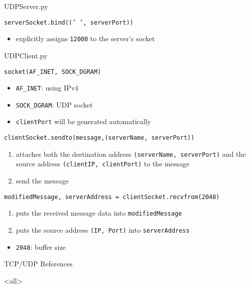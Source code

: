 \begin{frame}{UDPServer.py}
  \begin{center}
  \end{center}
  \begin{iblock}{\texttt{serverSocket.bind(('\,', serverPort))}}
    \begin{itemize}
    \item explicitly assigns \texttt{12000} to the server's socket
    \end{itemize}
  \end{iblock}
\end{frame}

\begin{frame}[t,allowframebreaks]{UDPClient.py}
  \begin{center}
  \end{center}
  \begin{iblock}{\texttt{socket(AF\_INET, SOCK\_DGRAM)}}
    \begin{itemize}
    \item \texttt{AF\_INET}: using IPv4
    \item \texttt{SOCK\_DGRAM}: UDP socket
    \item \texttt{clientPort} will be generated automatically
    \end{itemize}
  \end{iblock}
  \begin{iblock}{\texttt{clientSocket.sendto(message,(serverName, serverPort))}}
    \begin{enumerate}
    \item attaches both the destination address \texttt{(serverName, serverPort)} and the
      source address \texttt{(clientIP, clientPort)} to the message
    \item send the message
    \end{enumerate}
  \end{iblock}
  \begin{iblock}{\texttt{modifiedMessage, serverAddress = clientSocket.recvfrom(2048)}}
    \begin{enumerate}
    \item puts the received message data into \texttt{modifiedMessage}
    \item puts the source address \texttt{(IP, Port)} into \texttt{serverAddress}
    \end{enumerate}
    \begin{itemize}
    \item \texttt{2048}: buffer size
    \end{itemize}
  \end{iblock}
\end{frame}

\begin{frame}{TCP/UDP References}
  \begin{refsection}
    \nocite{wiki:tcp, wiki:udp, wiki:checksum, rfc793, rfc768, wiki:socket, hall2009beej}
    \printbibliography[heading=none]
  \end{refsection}
\end{frame}

\mode<all>
